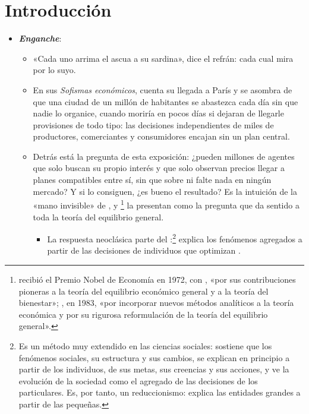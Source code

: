 \documentclass[11pt]{article}
\begin{document}
\tceetitulo

\section*{Introducción}

\begin{itemize}
\item \textbf{\emph{Enganche}}:
  \begin{itemize}
  \item «Cada uno arrima el ascua a su sardina», dice el refrán: cada cual mira por lo suyo.
  \item En sus \emph{Sofismas económicos}, \textcite[1.ª serie, cap.~XVIII]{Bastiat1845Sophismes} cuenta su llegada a París y se asombra de que una ciudad de un millón de habitantes se abastezca cada día sin que nadie lo organice, cuando moriría en pocos días si dejaran de llegarle provisiones de todo tipo: las decisiones independientes de miles de productores, comerciantes y consumidores encajan sin un plan central.
  \item Detrás está la pregunta de esta exposición: ¿pueden millones de agentes que solo buscan su propio interés y que solo observan precios llegar a planes compatibles entre sí, sin que sobre ni falte nada en ningún mercado? Y si lo consiguen, ¿es bueno el resultado? Es la intuición de la «mano invisible» de \textcite{Smith1776Wealth}, y \textcite{ArrowHahn1971General}\footnote{ recibió el Premio Nobel de Economía en 1972, con , «por sus contribuciones pioneras a la teoría del equilibrio económico general y a la teoría del bienestar»\nocite{Nobel1972HicksArrow}; , en 1983, «por incorporar nuevos métodos analíticos a la teoría económica y por su rigurosa reformulación de la teoría del equilibrio general»\nocite{Nobel1983Debreu}.} la presentan como la pregunta que da sentido a toda la teoría del equilibrio general.
    \begin{itemize}
    \item La respuesta neoclásica parte del :\footnote{Es un método muy extendido en las ciencias sociales: sostiene que los fenómenos sociales, su estructura y sus cambios, se explican en principio a partir de los individuos, de sus metas, sus creencias y sus acciones, y ve la evolución de la sociedad como el agregado de las decisiones de los particulares. Es, por tanto, un reduccionismo: explica las entidades grandes a partir de las pequeñas.} explica los fenómenos agregados a partir de las decisiones de individuos que optimizan .

\end{itemize}
\end{itemize}
\end{itemize}
\end{document}
